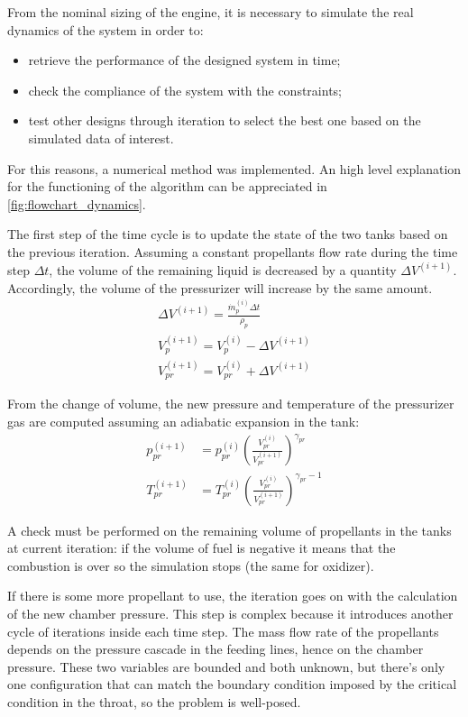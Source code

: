 From the nominal sizing of the engine, it is necessary to simulate the real dynamics of the system in order to:

\begin{itemize}
    \item retrieve the performance of the designed system in time;
    \item check the compliance of the system with the constraints;
    \item test other designs through iteration to select the best one based on the simulated data of interest.
\end{itemize}

For this reasons, a numerical method was implemented. An high level explanation for the functioning of the algorithm can be appreciated in \autoref{fig:flowchart_dynamics}.


The first step of the time cycle is to update the state of the two tanks based on the previous iteration. Assuming a constant propellants flow rate during the time step $\Delta t$, the volume of the remaining liquid is decreased by a quantity $\Delta V ^ {(i+1)}$. Accordingly, the volume of the pressurizer will increase by the same amount.
\begin{gather}
    \Delta V ^ {(i+1)} = \frac{\dot{m}_p^{(i)} \Delta t}{\rho_p} \\
    V_p ^ {(i+1)} = V_p ^ {(i)} - \Delta V ^ {(i+1)} \\
    V_{pr} ^ {(i+1)} = V_{pr} ^ {(i)} + \Delta V ^ {(i+1)}
\end{gather}

From the change of volume, the new pressure and temperature of the pressurizer gas are computed assuming an adiabatic expansion in the tank:
\begin{align}
    p_{pr} ^ {(i+1)} &= p_{pr} ^ {(i)} \left( \frac{V_{pr} ^ {(i)}}{V_{pr} ^ {(i+1)}} \right) ^ {\gamma_{pr}} \\
    T_{pr} ^ {(i+1)} &= T_{pr} ^ {(i)} \left( \frac{V_{pr} ^ {(i)}}{V_{pr} ^ {(i+1)}} \right) ^ {\gamma_{pr} - 1}
\end{align}

A check must be performed on the remaining volume of propellants in the tanks at current iteration: if the volume of fuel is negative it means that the combustion is over so the simulation stops (the same for oxidizer).

If there is some more propellant to use, the iteration goes on with the calculation of the new chamber pressure. This step is complex because it introduces another cycle of iterations inside each time step.
The mass flow rate of the propellants depends on the pressure cascade in the feeding lines, hence on the chamber pressure. These two variables are bounded and both unknown, but there's only one configuration that can match the boundary condition imposed by the critical condition in the throat, so the problem is well-posed.

